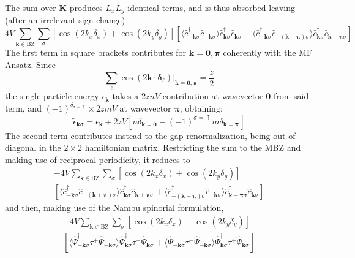 The sum over $\mathbf{K}$ produces $L_xL_y$ identical terms, and is thus absorbed leaving (after an irrelevant sign change)
\[
	4V \sum_{\mathbf{k} \in \mathrm{BZ}} \sum_\sigma \left[
		\cos \left(
			2k_x \delta_x
		\right)	+ \cos \left(
			2k_y \delta_y
		\right)	
	\right]
	\left[
		\langle
			\hat c_{-\mathbf{k} \sigma}^\dagger 
			\hat c_{-\mathbf{k} \sigma}
		\rangle
		\hat c_{\mathbf{k} \sigma}^\dagger  \hat c_{\mathbf{k}\sigma}
		-
		\langle
			\hat c_{-\mathbf{k} \sigma}^\dagger 
			\hat 	c_{-(\mathbf{k}+\bm{\pi}) \sigma}
		\rangle
		\hat c_{\mathbf{k} \sigma}^\dagger  \hat c_{\mathbf{k}+\bm{\pi}\sigma}
	\right]
\]
The first term in square brackets contributes for $\mathbf{k}=\mathbf{0},\bm{\pi}$ coherently with the MF Ansatz. Since
\[
	\sum_\ell \cos \left(
		2\mathbf{k} \cdot \bm{\delta}_\ell
	\right)	\Big|_{\mathbf{k}=\mathbf{0},\bm{\pi}}= \frac{z}{2}
\]
the single particle energy $\epsilon_\mathbf{k}$ takes a $2znV$ contribution at wavevector $\mathbf{0}$ from said term, and $(-1)^{\delta_{\sigma=\uparrow}} \times 2zmV$ at wavevector $\bm{\pi}$, obtaining:
\[
	\tilde{\epsilon}_{\mathbf{k}\sigma} = \epsilon_\mathbf{k} + 2zV \left[
		n\delta_{\mathbf{k}=\mathbf{0}} - (-1)^{\sigma=\uparrow} m \delta_{\mathbf{k}=\bm{\pi}}
	\right]
\]
The second term contributes instead to the gap renormalization, being out of diagonal in the $2\times2$ hamiltonian matrix. Restricting the sum to the MBZ and making use of reciprocal periodicity, it reduces to
\begin{multline*}
	- 4V \sum_{\mathbf{k} \in \mathrm{BZ}} \sum_\sigma \left[
		\cos \left(
			2k_x \delta_x
		\right)	+ \cos \left(
			2k_y \delta_y
		\right)	
	\right] \\
	\left[
		\langle
			\hat c_{-\mathbf{k} \sigma}^\dagger 
			\hat c_{-(\mathbf{k}+\bm{\pi}) \sigma}
		\rangle
		\hat c_{\mathbf{k} \sigma}^\dagger  \hat c_{\mathbf{k}+\bm{\pi}\sigma} + \langle
			\hat c_{-(\mathbf{k}+\bm{\pi}) \sigma}^\dagger 
			\hat c_{-\mathbf{k} \sigma}
		\rangle
		\hat c_{\mathbf{k}+\bm{\pi} \sigma}^\dagger  \hat c_{\mathbf{k}\sigma}
	\right]
\end{multline*}
and then, making use of the Nambu spinorial formulation,
\begin{multline*}
	- 4V \sum_{\mathbf{k} \in \mathrm{BZ}} \sum_\sigma \left[
		\cos \left(
			2k_x \delta_x
		\right)	+ \cos \left(
			2k_y \delta_y
		\right)	
	\right] \\
	\left[
		\langle
			\hat \Psi_{-\mathbf{k} \sigma}^\dagger \tau^+
			\hat \Psi_{-\mathbf{k}\sigma}
		\rangle
		\hat \Psi_{\mathbf{k} \sigma}^\dagger \tau^- \hat \Psi_{\mathbf{k}\sigma} + \langle
			\hat \Psi_{-\mathbf{k} \sigma}^\dagger \tau^-
			\hat \Psi_{-\mathbf{k}\sigma}
		\rangle
		\hat \Psi_{\mathbf{k} \sigma}^\dagger \tau^+ \hat \Psi_{\mathbf{k}\sigma}
	\right]
\end{multline*}
\todo

